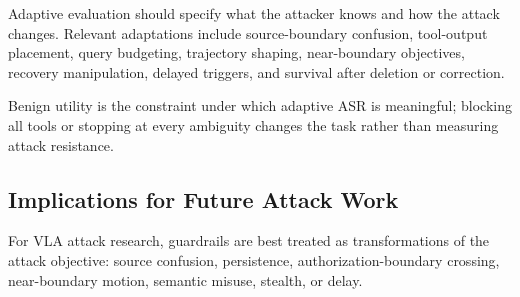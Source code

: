 Adaptive evaluation should specify what the attacker knows and how the attack changes. Relevant adaptations include source-boundary confusion, tool-output placement, query budgeting, trajectory shaping, near-boundary objectives, recovery manipulation, delayed triggers, and survival after deletion or correction.

Benign utility is the constraint under which adaptive ASR is meaningful; blocking all tools or stopping at every ambiguity changes the task rather than measuring attack resistance.

\subsection{Implications for Future Attack Work}

For VLA attack research, guardrails are best treated as transformations of the attack objective: source confusion, persistence, authorization-boundary crossing, near-boundary motion, semantic misuse, stealth, or delay.
